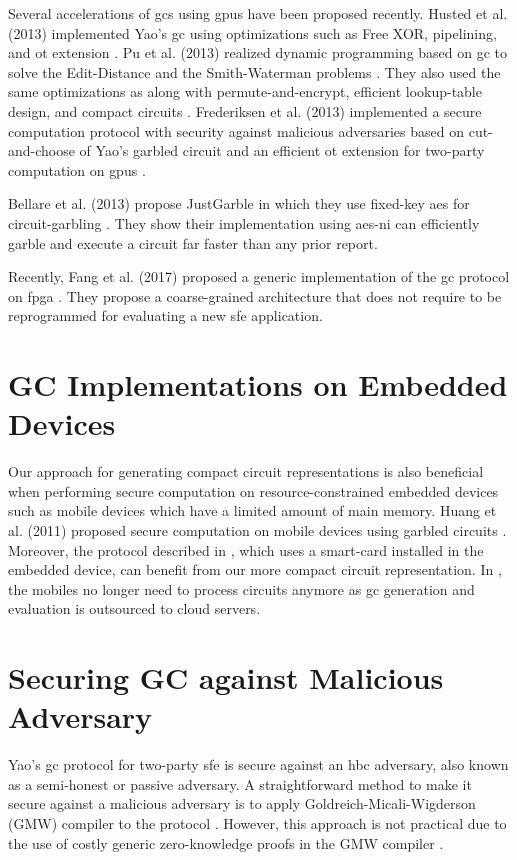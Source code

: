 Several accelerations of \acrshort{gc}s using \acrshort{gpu}s have been proposed recently.
Husted et al. (2013) implemented Yao's \acrshort{gc} using optimizations such as Free XOR, pipelining, and \acrshort{ot} extension \cite{husted2013gpu}.
Pu et al. (2013) realized dynamic programming based on \acrshort{gc} to solve the Edit-Distance and the Smith-Waterman problems \cite{pu2013computing}.
They also used the same optimizations as \cite{husted2013gpu} along with permute-and-encrypt, efficient lookup-table design, and compact circuits \cite{pu2013computing}.
Frederiksen et al. (2013) implemented a secure computation protocol with security against malicious adversaries based on cut-and-choose of Yao's garbled circuit and an efficient \acrshort{ot} extension for two-party computation on \acrshort{gpu}s \cite{frederiksen2013fast}.

Bellare et al. (2013) propose JustGarble in which they use fixed-key \acrshort{aes} for circuit-garbling \cite{bellare2013efficient}.
They show their implementation using \acrshort{aes-ni} can efficiently garble and execute a circuit far faster than any prior report.

Recently, Fang et al. (2017) proposed a generic implementation of the \acrshort{gc} protocol on \acrshort{fpga} \cite{fang2017secure}.
They propose a coarse-grained architecture that does not require to be reprogrammed for evaluating a new \acrshort{sfe} application.

\section{GC Implementations on Embedded Devices} \label{sec:related-embedded}
Our approach for generating compact circuit representations is also beneficial when performing secure computation on resource-constrained embedded devices such as mobile devices which have a limited amount of main memory.
Huang et al. (2011) proposed secure computation on mobile devices using garbled circuits \cite{huang2011privacy}.
Moreover, the protocol described in \cite{demmler2014ad}, which uses a smart-card installed in the embedded device, can benefit from our more compact circuit representation.
In \cite{carter2016secure, carter2014whitewash}, the mobiles no longer need to process circuits anymore as \acrshort{gc} generation and evaluation is outsourced to cloud servers.

\section{Securing GC against Malicious Adversary}\label{sec:related-malicious}
Yao's \acrshort{gc} protocol for two-party \acrshort{sfe} is secure against an \acrfull{hbc} adversary, also known as a semi-honest or passive adversary.
A straightforward method to make it secure against a malicious adversary is to apply Goldreich-Micali-Wigderson (GMW) compiler to the protocol \cite{goldreich1987play}.
However, this approach is not practical due to the use of costly generic zero-knowledge proofs in the GMW compiler \cite{lindell2007efficient}.

